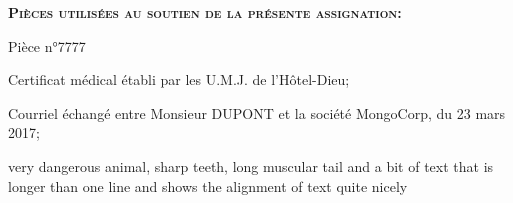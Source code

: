\documentclass[12pt,a4paper]{article}
\begin{document}
\pagebreak


\begin{center}
\Large{\textbf{\textsc{Pièces utilisées au soutien de la présente assignation}:}}
\end{center}

\vspace{1cm}

\begin{labeling}{Pièce n°7777}
\item [\textbf{Pièce n°1}] Certificat médical établi par les U.M.J. de l'Hôtel-Dieu;
\item [\textbf{Pièce n°2}] Courriel échangé entre Monsieur DUPONT et la société MongoCorp, du 23 mars 2017;
\item [\textbf{Pièce n°3}] very dangerous animal, sharp teeth, long
muscular tail and a bit of text that is longer than one
line and shows the alignment of text quite nicely
\end{labeling}
\end{document}
